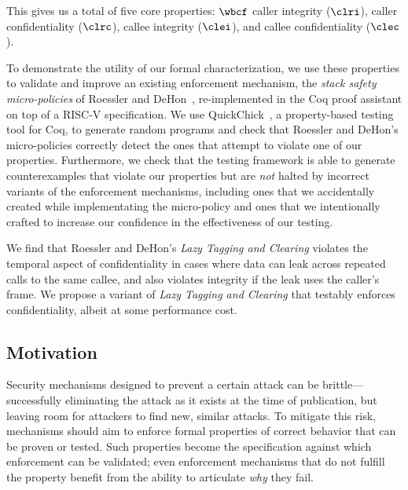 This gives us a total of five core properties: \(\wbcf\)
caller integrity (\(\clri\)), caller confidentiality (\(\clrc\)),
callee integrity (\(\clei\)), and callee confidentiality (\(\clec\)).

To demonstrate the utility of our formal characterization, we use these
properties to validate and improve an existing enforcement mechanism, the
{\em stack safety micro-policies} of Roessler and DeHon~\cite{DBLP:conf/sp/RoesslerD18}, re-implemented
in the Coq proof assistant on top of a  RISC-V specification.  We
use QuickChick~\cite{Denes:VSL2014,Pierce:SF4}, a property-based testing
tool for Coq, to generate random programs and check
that Roessler and DeHon's micro-policies correctly detect the ones that
attempt to violate one of our properties. Furthermore, we
check that the testing framework is able to generate counterexamples
that violate our properties but are \emph{not} halted by incorrect
variants of the enforcement mechanisms, including ones that we accidentally created
while implementating the micro-policy and ones that we
intentionally crafted to increase our confidence in the effectiveness
of our testing.
%

We find that Roessler and DeHon's \emph{Lazy Tagging and Clearing}
violates the temporal aspect of confidentiality in
cases where data can leak across repeated calls to the same callee,
and also violates integrity if the leak uses the caller's frame. We
propose a variant of {\em Lazy Tagging and Clearing} that testably enforces
confidentiality, albeit at some performance cost.
%

\subsection{Motivation}

Security mechanisms designed to prevent a certain attack can be brittle---successfully
eliminating the attack as it exists at the time of publication, but leaving room for attackers
to find new, similar attacks. To mitigate this risk, mechanisms should aim to enforce formal
properties of correct behavior that can be proven or tested. Such properties become the
specification against which enforcement can be validated; even enforcement mechanisms that do
not fulfill the property benefit from the ability to articulate {\it why} they fail.
%

